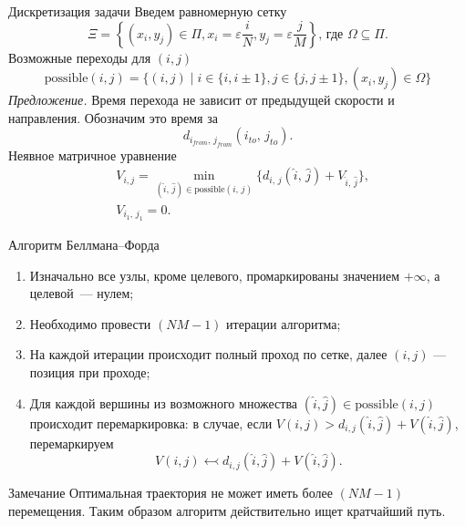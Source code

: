     \begin{frame}[t]{Дискретизация задачи}
        Введем равномерную сетку
        \begin{equation*}
            \Xi = \left\{ (x_i , y_j) \in \Pi , x_i = \varepsilon\frac{i}{N} , y_j = \varepsilon\frac{j}{M} \right\},\,
            \mbox{где $\Omega \subseteq \Pi$}.
        \end{equation*}
        Возможные переходы для $(i,j)$
        \begin{equation*}
            \mathrm{possible}(i,j) = \{
                (i, j) \;|\; i \in \{i, i \pm 1\}, j \in \{j, j \pm 1\}, (x_i,y_j) \in \Omega    
            \}
        \end{equation*}
        \textit{Предложение.} Время перехода не зависит от предыдущей скорости и направления. Обозначим это время за
        \begin{equation*}
            d_{i_{from},\,j_{from}}(i_{to},\,j_{to}).
        \end{equation*}
        Неявное матричное уравнение
        \begin{equation*}
            \begin{aligned}
                &V_{i,j} = \min\limits_{(\hat i,\,\hat j) \in \mathrm{possible}(i,\,j)}\{d_{i,\,j}(\hat i,\,\hat j) + V_{\hat i,\,\hat j}\}, \\
                &V_{i_1,\,j_1} = 0.
            \end{aligned}
        \end{equation*}
    \end{frame}
    \begin{frame}[t]{Алгоритм Беллмана--Форда}
        \begin{enumerate}
            \item Изначально все узлы, кроме целевого, промаркированы значением $+\infty$, а целевой~--- нулем;
            \item Необходимо провести $(NM - 1)$ итерации алгоритма;
            \item На каждой итерации происходит полный проход по сетке, далее $(i,j)$ --- позиция при проходе;
            \item Для каждой вершины из возможного множества $(\hat i, \hat j) \in \mathrm{possible}(i,j)$ происходит перемаркировка: в случае, если $V(i, j) > d_{i,j}(\hat i, \hat j) + V(\hat i, \hat j)$, перемаркируем
            \[
                V(i,j) \leftarrowtail d_{i,j}(\hat i, \hat j) + V(\hat i, \hat j).
            \]
        \end{enumerate}
        \begin{block}{Замечание}
            Оптимальная траектория не может иметь более $(NM - 1)$ перемещения. Таким образом алгоритм действительно ищет кратчайший путь.
        \end{block}
    \end{frame}
